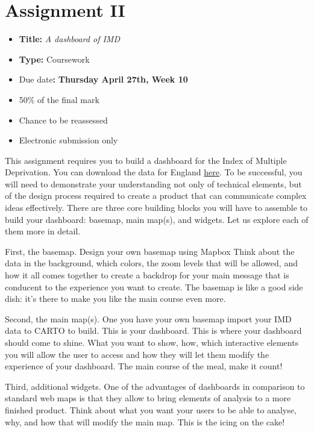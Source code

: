 \documentclass[
  letterpaper,
  DIV=11,
  numbers=noendperiod]{scrreprt}
\providecommand{\tightlist}{%
  \setlength{\itemsep}{0pt}\setlength{\parskip}{0pt}}\usepackage{longtable,booktabs,array}
\begin{document}
\section*{Assignment II}\label{assignment-ii}


\begin{itemize}
\tightlist
\item
  \textbf{Title:} \emph{A dashboard of IMD}
\item
  \textbf{Type:} Coursework
\item
  Due date\textbf{:} \textbf{Thursday April 27th, Week 10}
\item
  50\% of the final mark
\item
  Chance to be reassessed
\item
  Electronic submission only
\end{itemize}

This assignment requires you to build a dashboard for the Index of
Multiple Deprivation. You can download the data for England
\href{https://data.cdrc.ac.uk/dataset/index-multiple-deprivation-imd}{here}.
To be successful, you will need to demonstrate your understanding not
only of technical elements, but of the design process required to create
a product that can communicate complex ideas effectively. There are
three core building blocks you will have to assemble to build your
dashboard: basemap, main map(s), and widgets. Let us explore each of
them more in detail.

First, the basemap. Design your own basemap using Mapbox Think about the
data in the background, which colors, the zoom levels that will be
allowed, and how it all comes together to create a backdrop for your
main message that is conducent to the experience you want to create. The
basemap is like a good side dish: it's there to make you like the main
course even more.

Second, the main map(s). One you have your own basemap import your IMD
data to CARTO to build. This is your dashboard. This is where your
dashboard should come to shine. What you want to show, how, which
interactive elements you will allow the user to access and how they will
let them modify the experience of your dashboard. The main course of the
meal, make it count!

Third, additional widgets. One of the advantages of dashboards in
comparison to standard web maps is that they allow to bring elements of
analysis to a more finished product. Think about what you want your
users to be able to analyse, why, and how that will modify the main map.
This is the icing on the cake!
\end{document}
